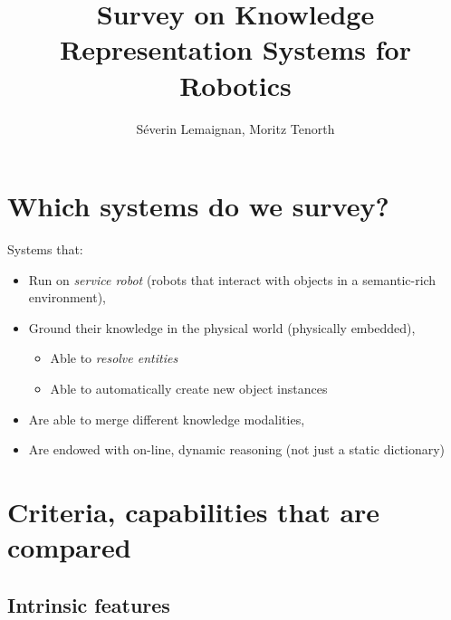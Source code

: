 \documentclass[twocolumn,a4paper]{article}
\title{Survey on Knowledge Representation Systems for Robotics}
\author{Séverin Lemaignan, Moritz Tenorth}
\begin{document}
\maketitle
\tableofcontents

\section{Which systems do we survey?}

Systems that:


\begin{itemize}
	\item  Run on \emph{service robot} (robots that interact with objects in a semantic-rich environment),
	\item  Ground their knowledge in the physical world (physically embedded),
	\begin{itemize}
		\item  Able to \emph{resolve entities}
		\item  Able to automatically create new object instances
	\end{itemize}

	\item  Are able to merge different knowledge modalities,
	\item  Are endowed with on-line, dynamic reasoning (not just a static dictionary)
\end{itemize}

\section{Criteria, capabilities that are compared}

\subsection{Intrinsic features}
\end{document}
